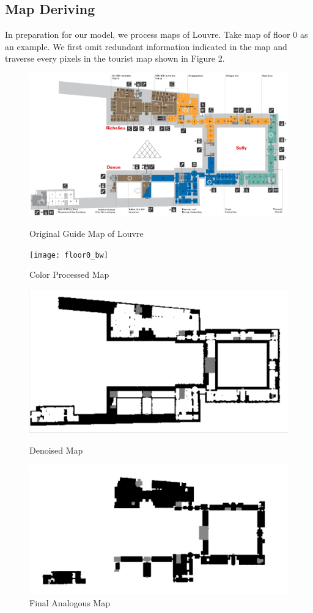 \documentclass{mcmthesis}
\begin{document}
\subsection{Map Deriving}
In preparation for our model, we process maps of Louvre.\cite{} Take map of floor 0 as an example. We first omit redundant information indicated in the map and traverse every pixels in the tourist map shown in Figure 2. 

\begin{figure}[H]
\parbox[b]{.5\textwidth}{
\includegraphics[scale=0.25]{floor0_photo}
\centering\captionsetup{font=small, labelfont=bf}\caption{Original Guide  Map of Louvre}
}
\parbox[b]{.5\textwidth}{
\texttt{[image: floor0\_bw]}
\centering\captionsetup{font=small, labelfont=bf}\caption{Color Processed  Map}
}
\parbox[b]{.5\textwidth}{
\includegraphics[scale=0.24]{floor0_noise_pre}
\centering\captionsetup{font=small, labelfont=bf}\caption{Denoised Map}
}
\parbox[b]{.5\textwidth}{
\includegraphics[scale=0.47]{floor0}
\centering\captionsetup{font=small, labelfont=bf}\caption{Final Analogous Map}
}
\end{figure}
\end{document}
